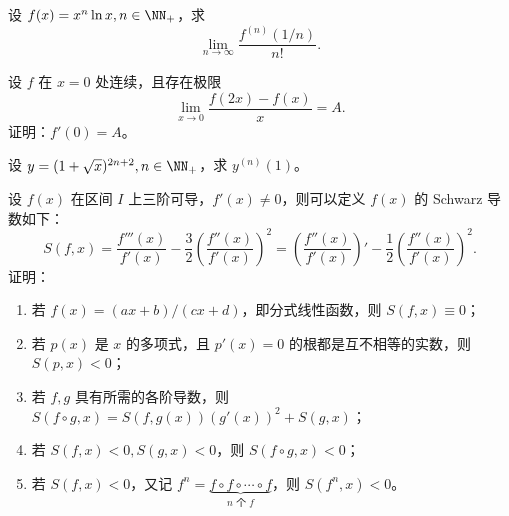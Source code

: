 \begin{xreferenceproblem}[9]
设 $f(x)=x^n\ln x,n\in\NN_+$，求
  \[
    \lim_{n\to\infty}\frac{f^{(n)}(1/n)}{n!}.
  \]
\end{xreferenceproblem}

\begin{xreferenceproblem}[10]
设 $f$ 在 $x=0$ 处连续，且存在极限
  \[
    \lim_{x\to0}\frac{f(2x)-f(x)}x=A.
  \]
  证明：$f'(0)=A$。
\end{xreferenceproblem}

\begin{xreferenceproblem}[11]
设 $y=(1+\sqrt{x})^{2n+2},n\in\NN_+$，求 $y^{(n)}(1)$。
\end{xreferenceproblem}

\begin{xreferenceproblem}[12]
设 $f(x)$ 在区间 $I$ 上三阶可导，$f'(x)\ne0$，则可以定义 $f(x)$ 的 Schwarz 导数如下：
  \[
    S(f,x)=\frac{f'''(x)}{f'(x)}-\frac32\left(\frac{f''(x)}{f'(x)}\right)^2
    =\left(\frac{f''(x)}{f'(x)}\right)'-\frac12\left(\frac{f''(x)}{f'(x)}\right)^2.
  \]
  证明：
  \begin{enumerate}[label=(\arabic*)]
    \item 若 $f(x)=(ax+b)/(cx+d)$，即分式线性函数，则 $S(f,x)\equiv0$；
    \item 若 $p(x)$ 是 $x$ 的多项式，且 $p'(x)=0$ 的根都是互不相等的实数，则 $S(p,x)<0$；
    \item 若 $f,g$ 具有所需的各阶导数，则 $S(f\circ g,x)=S(f,g(x))(g'(x))^2+S(g,x)$；
    \item 若 $S(f,x)<0,S(g,x)<0$，则 $S(f\circ g,x)<0$；
    \item 若 $S(f,x)<0$，又记 $f^n=\underbrace{f\circ f\circ\cdots\circ f}_{n\text{ 个 }f}$，则 $S(f^n,x)<0$。
  \end{enumerate}
\end{xreferenceproblem}

